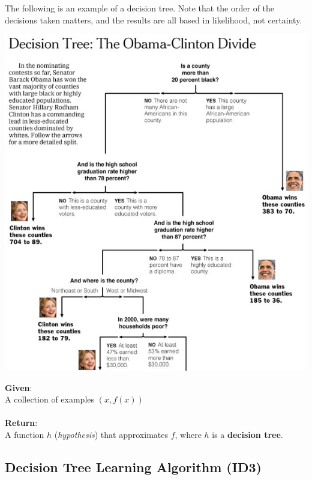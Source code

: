 \documentclass[english, 10pt]{article}
\begin{document}
The following is an example of a decision tree. Note that the order of the decisions taken matters, and the results are all based in likelihood, not certainty.\\

\begin{center}
	\includegraphics[scale=0.4]{img/dtree.png}\\
\end{center}

\begin{myproof}
\textbf{Given}:\\
A collection of examples $(x, f(x))$\\\\

\textbf{Return}:\\
A function $h$ (\textit{hypothesis}) that approximates $f$, where $h$ is a \textbf{decision tree}.
\end{myproof}


\subsection{Decision Tree Learning Algorithm (ID3)}
\end{document}
